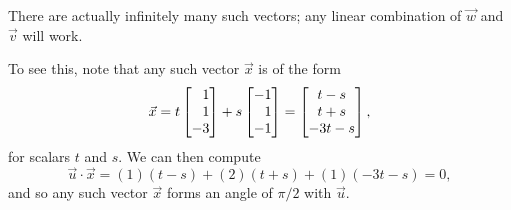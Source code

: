 \documentclass{workbook}
\begin{document}
\begin{slide}
\begin{parts}
\begin{enumerate}
\begin{solution}
					There are actually infinitely many such vectors; any linear
					combination of $\vec w$ and $\vec v$ will work.

					To see this, note that any such vector $\vec x$ is of the form
					\[
						\vec x = t \mat{1\\1\\-3} + s \mat{-1\\1\\-1}
						= \matc{t-s\\t+s\\-3t-s},
					\]
					for scalars $t$ and $s$. We can then compute
					\[
						\vec u \cdot \vec x = (1)(t-s) + (2)(t+s) + (1)(-3t-s) = 0,
					\]
					and so any such vector $\vec x$ forms an angle of $\pi/2$
					with $\vec u$.
				\end{solution}
		\end{enumerate}
	\end{parts}
\end{slide}
\end{document}
